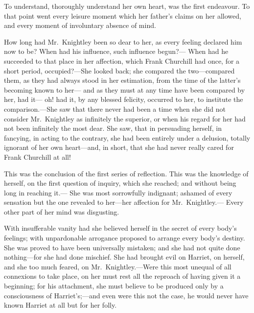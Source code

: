 To understand, thoroughly understand her own heart, was the
first endeavour.  To that point went every leisure moment which her
father's claims on her allowed, and every moment of involuntary
absence of mind.

How long had Mr.\ Knightley been so dear to her, as every feeling
declared him now to be?  When had his influence, such influence begun?---%
When had he succeeded to that place in her affection, which Frank
Churchill had once, for a short period, occupied?---She looked back;
she compared the two---compared them, as they had always stood in
her estimation, from the time of the latter's becoming known to her---%
and as they must at any time have been compared by her, had it---%
oh! had it, by any blessed felicity, occurred to her, to institute
the comparison.---She saw that there never had been a time when she
did not consider Mr.\ Knightley as infinitely the superior, or when
his regard for her had not been infinitely the most dear.  She saw,
that in persuading herself, in fancying, in acting to the contrary,
she had been entirely under a delusion, totally ignorant of her
own heart---and, in short, that she had never really cared for Frank
Churchill at all!

This was the conclusion of the first series of reflection.
This was the knowledge of herself, on the first question of inquiry,
which she reached; and without being long in reaching it.---%
She was most sorrowfully indignant; ashamed of every sensation
but the one revealed to her---her affection for Mr.\ Knightley.---%
Every other part of her mind was disgusting.

With insufferable vanity had she believed herself in the secret of every
body's feelings; with unpardonable arrogance proposed to arrange every
body's destiny.  She was proved to have been universally mistaken;
and she had not quite done nothing---for she had done mischief.
She had brought evil on Harriet, on herself, and she too much feared,
on Mr.\ Knightley.---Were this most unequal of all connexions to
take place, on her must rest all the reproach of having given it
a beginning; for his attachment, she must believe to be produced only
by a consciousness of Harriet's;---and even were this not the case,
he would never have known Harriet at all but for her folly.

